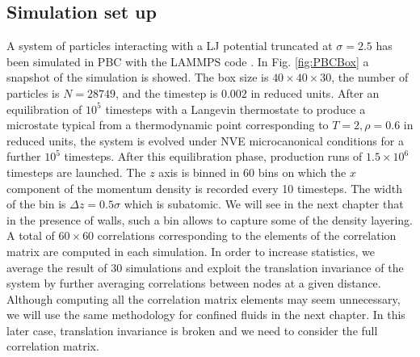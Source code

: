 \documentclass[b5paper,openright,10pt]{book}
\begin{document}
\subsection{Simulation set up}
\label{Sec:SimSetUpPBC}
A  system  of particles  interacting  with  a LJ  potential
truncated at  $\sigma=2.5$ has been  simulated in PBC with  the LAMMPS code \cite{Plimpton1995}.
In Fig. \ref{fig:PBCBox} a snapshot of the simulation is showed.
The box  size is $40\times40\times30$, the  number of particles
is $N=28749$, and the timestep is $0.002$ in reduced units.  After an
equilibration  of  $10^5$ timesteps  with  a  Langevin thermostate  to
produce a microstate typical  from a thermodynamic point corresponding
to $T=2,\rho=0.6$  in reduced units,  the system is evolved  under NVE
microcanonical conditions for a  further $10^5$ timesteps.  After this
equilibration phase,  production runs  of $1.5\times 10^6$  timesteps
are launched.  The  $z$ axis is binned  in $60$ bins on  which the $x$
component of the momentum density is recorded every 10 timesteps.  The
width of the  bin is $\Delta z=0.5\sigma$ which is  subatomic.  We will see in the next chapter that in the
presence of walls,  such a bin allows to capture some of the density layering.  A total of $60\times  60$ correlations corresponding to the
elements of  the correlation matrix  are computed in  each simulation.
In  order  to increase  statistics,  we  average  the result  of  $30$
simulations and  exploit the  translation invariance  of the  system by
further  averaging correlations  between  nodes at  a given  distance.
Although  computing  all  the  correlation matrix  elements  may  seem
unnecessary, we will  use the same methodology for  confined fluids in
the next chapter. In this later case, translation invariance is
broken and we need to consider the full correlation matrix.
\end{document}
